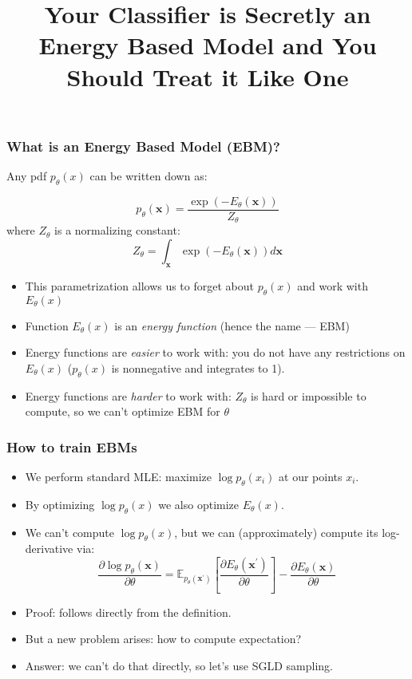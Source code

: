 \documentclass[10pt]{beamer}
\title{Your Classifier is Secretly an Energy Based Model and You Should Treat it Like One}
\begin{document}
\begin{frame}
    \titlepage
\end{frame}

\begin{frame}
    \frametitle{What is an Energy Based Model (EBM)?}
\pause
Any pdf $p_\theta(x)$ can be written down as:
    
    \begin{equation}
p_{\theta}(\mathbf{x})=\frac{\exp \left(-E_{\theta}(\mathbf{x})\right)}{Z_\theta}
\end{equation}
\pause
where $Z_\theta$ is a normalizing constant:
\begin{equation*}
Z_\theta = \int_{\bm x} \exp{(-E_\theta(\bm x))}d\bm x
\end{equation*}

\begin{itemize}
    \item\pause This parametrization allows us to forget about $p_\theta(x)$ and work with $E_\theta(x)$
    \item\pause Function $E_\theta(x)$ is an \textit{energy function} (hence the name --- EBM)
    \item\pause Energy functions are \textit{easier} to work with: you do not have any restrictions on $E_\theta(x)$ ($p_\theta(x)$ is nonnegative and integrates to 1).
    \item\pause Energy functions are \textit{harder} to work with: $Z_\theta$ is hard or impossible to compute, so we can't optimize EBM for $\theta$
\end{itemize}
\end{frame}

\begin{frame}
    \frametitle{How to train EBMs}
    
    \begin{itemize}
        \item\pause We perform standard MLE: maximize $\log p_\theta(x_i)$ at our points $x_i$.
        \item\pause By optimizing $\log p_\theta(x)$ we also optimize $E_\theta(x)$.
        \item\pause We can't compute $\log p_\theta(x)$, but we can (approximately) compute its log-derivative via:
\begin{equation}
\frac{\partial \log p_{\theta}(\mathbf{x})}{\partial \theta}=\mathbb{E}_{p_{\theta}\left(\mathbf{x}^{\prime}\right)}\left[\frac{\partial E_{\theta}\left(\mathbf{x}^{\prime}\right)}{\partial \theta}\right]-\frac{\partial E_{\theta}(\mathbf{x})}{\partial \theta}
\end{equation}
        \item\pause Proof: follows directly from the definition.
        \item\pause But a new problem arises: how to compute expectation?
        \item\pause Answer: we can't do that directly, so let's use SGLD sampling.
    \end{itemize}
\end{frame}
\end{document}

